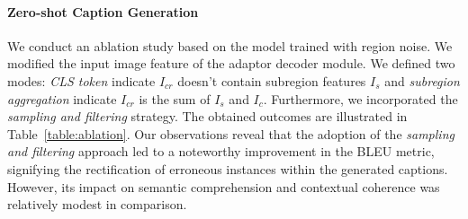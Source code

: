\paragraph{\textbf{Zero-shot Caption Generation}}
We conduct an ablation study based on the model trained with region noise. We modified the input image feature of the adaptor decoder module. We defined two modes: \textit{CLS token} indicate $I_{cr}$ doesn't contain subregion features $I_s$ and \textit{subregion aggregation} indicate $I_{cr}$ is the sum of $I_s$ and $I_c$. Furthermore, we incorporated the \textit{sampling and filtering} strategy. The obtained outcomes are illustrated in Table~\ref{table:ablation}. Our observations reveal that the adoption of the \textit{sampling and filtering} approach led to a noteworthy improvement in the BLEU metric, signifying the rectification of erroneous instances within the generated captions. However, its impact on semantic comprehension and contextual coherence was relatively modest in comparison.





